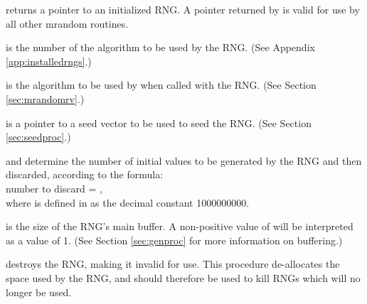  returns a pointer to an initialized RNG.  A pointer
returned by  is valid for use by all other mrandom routines.

 is the number of the algorithm to be used by the RNG.  (See
Appendix \ref{app:installedrngs}.)

 is the algorithm to be used by  when
called with the RNG.  (See Section \ref{sec:mrandomrv}.)

 is a pointer to a seed vector to be used to seed the RNG.
(See Section \ref{sec:seedproc}.)

 and  determine the number of initial values
to be generated by the RNG and then discarded, according to the formula:\\

number to discard = ,\\

 where  is defined in  as the decimal
constant 1000000000.

 is the size of the RNG's main buffer.  A non-positive value of
 will be interpreted as a value of 1.  (See Section
\ref{sec:genproc} for more information on buffering.)

 destroys the RNG, making it invalid for use.  This
procedure de-allocates the space used by the RNG, and should therefore
be used to kill RNGs which will no longer be used.


